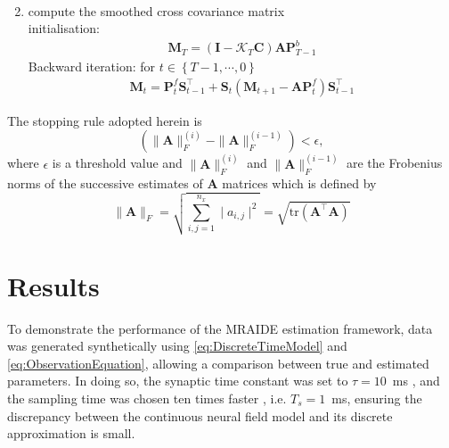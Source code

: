 \documentclass[11pt,draftcls,onecolumn,peerreview]{IEEEtran}
\newcommand{\cut}[1]{\textcolor{cyan}{#1}}
\begin{document}
\begin{algorithm}
\begin{enumerate}
\begin{align}
 \end{align}
 \item compute the smoothed cross covariance matrix\\
 initialisation:
 \begin{align}
  \mathbf M_T=(\mathbf I-\mathcal K_T\mathbf C)\mathbf A\mathbf P_{T-1}^b \nonumber
 \end{align}
 Backward iteration: for $t\in\left\lbrace T-1,\cdots,0\right\rbrace $
 \begin{align}
 \mathbf M_t= \mathbf P_t^{f}\mathbf S_{t-1}^{\top}+\mathbf S_{t}(\mathbf M_{t+1}-\mathbf A\mathbf P_t^{f} )\mathbf S_{t-1}^{\top}\nonumber
 \end{align}
 \end{enumerate}
 \end{algorithm}
The stopping rule adopted herein is
\begin{equation}
 \left(\parallel \mathbf{A} \parallel_{F}^{(i)}-\parallel \mathbf{A} \parallel_{F}^{(i-1)}\right)<\epsilon,
 \end{equation}
 where $\epsilon$ is a threshold value and $\parallel \mathbf{A} \parallel_{F}^{(i)}$ and $ \parallel \mathbf{A} \parallel_{F}^{(i-1)}$ are the Frobenius norms  of the successive estimates of $\mathbf{A} $ matrices which is defined by \cite{Meyer2000}
 \begin{equation}
  \parallel \mathbf{A} \parallel_{F}=\sqrt{\sum_{i,j=1}^{n_x}\mid a_{i,j} \mid^2}=\sqrt{\mathrm{tr} (\mathbf A^{\top}\mathbf A)}
 \end{equation}

\section{Results}\label{sec:MRA-results}
To demonstrate the performance of the MRAIDE estimation framework, data was generated synthetically  using \eqref{eq:DiscreteTimeModel} and \eqref{eq:ObservationEquation}, allowing a comparison between true and estimated parameters. In doing so, the synaptic time constant was set to $\tau = 10$~ms \cite{David2003}, and the sampling time was chosen ten times faster \cite{Stephan2008}, i.e. $T_s = 1$~ms, ensuring the discrepancy between the continuous neural field model and its discrete approximation is small. 
\end{document}
